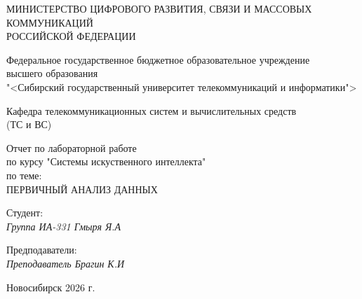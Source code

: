 \thispagestyle{empty}

\begin{center}
    МИНИСТЕРСТВО ЦИФРОВОГО РАЗВИТИЯ, СВЯЗИ И МАССОВЫХ КОММУНИКАЦИЙ \\ РОССИЙСКОЙ ФЕДЕРАЦИИ

    \vspace{20pt}

    Федеральное государственное бюджетное образовательное учреждение  \\  высшего образования \\
    "<Сибирский государственный университет телекоммуникаций и информатики"> \\

    \vspace{20pt}

    Кафедра телекоммуникационных систем и вычислительных средств \\  (ТС и ВС)
\end{center}

\vfill

\begin{center}
    Отчет по лабораторной работе \\  
    по курсу "Системы искуственного интеллекта" \\
    \vspace{20pt}
    по теме: \\
    \uppercase{Первичный анализ данных}
\end{center}

\vfill

    \noindent Студент: \\
    \textit{Группа ИА-331 \hfill Гмыря Я.А} 

    \vspace{20pt}
 
    \noindent Предподаватели: \\
    \textit{Преподаватель \hfill Брагин К.И} \\
\vfill

\begin{center}
    Новосибирск 2026 г.
\end{center}